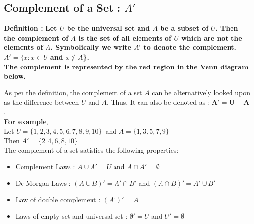 \documentclass[12pt, letterpaper]{article}
\begin{document}
\subsection{Complement of a Set : $A'$}
\begin{displayquote}
\textbf{ Definition : Let $U$ be the universal set and $A$ be a subset of $U$. Then the complement of $A$ is the set of all elements of $U$ which are not the elements of $A$. Symbolically we write $A'$ to denote the complement. $A' = \{ x : x \in U$ and $x \notin A$\}. \\
The complement is represented by the red region in the Venn diagram below.}
\end{displayquote}
\begin{center}
\end{center}
As per the definition, the complement of a set $A$ can be alternatively looked upon as the difference between $U$ and $A$. Thus, It can also be denoted as : $\mathbf{A' = U-A}$.\\
\textbf{For example},\\ 
Let $U = \{1,2,3,4,5,6,7,8,9,10\}$\ and $A = \{1,3,5,7,9\}$\\
Then $A' = \{2,4,6,8,10\}$\\
The complement of a set satisfies the following properties: 
\begin{itemize}
    \item Complement Laws : $A \cup A' = U$ and $A \cap A' = \emptyset$
    \item De Morgan Laws : $(A \cup B)' = A' \cap B'$ and $(A \cap B)' = A' \cup B'$
    \item Law of double complement : $(A')' = A$
    \item Laws of empty set and universal set : $\emptyset' = U$ and $U' = \emptyset$
\end{itemize}
\end{document}
